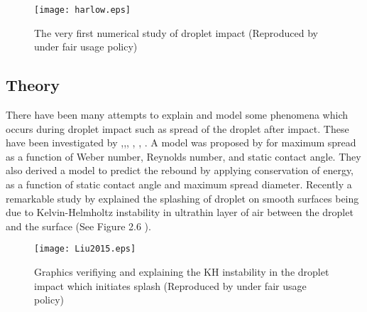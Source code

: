 \begin{figure}[tbp]
\centering
 \texttt{[image: harlow.eps]}
 \caption[First numerical study on droplet impact]{The very first numerical study of droplet 
 impact (Reproduced by \cite{Harlow1967} under fair usage policy)}
\end{figure}

\subsection{Theory}
There have been many attempts to explain and model some phenomena which occurs during droplet impact such as 
spread of the droplet after impact. These have been investigated by \cite{Madejski1976},\cite{Jones1971},\cite{Chandra1991}, \cite{Scheller1995}, \cite{Bennett1993}, \cite{Pasandideh1996}.
A model was proposed by \cite{Mao1997} for maximum spread as a function of 
 Weber number, Reynolds number, and static contact angle. They also derived a model to predict the rebound by applying conservation of energy, as a function of 
 static contact angle and maximum spread diameter.
Recently a remarkable study by \cite {Liu2015} explained the splashing of droplet on smooth surfaces being due to Kelvin-Helmholtz instability in ultrathin layer of 
air between the droplet and the surface (See Figure 2.6 ).
\begin{figure}
 \centering
 \texttt{[image: Liu2015.eps]}
 \caption[Kelvin-Helmholtz instability in a droplet splash]{Graphics verifiying and explaining the KH instability in the droplet impact which initiates splash (Reproduced by \cite{Liu2015} under fair usage policy)}
\end{figure}
